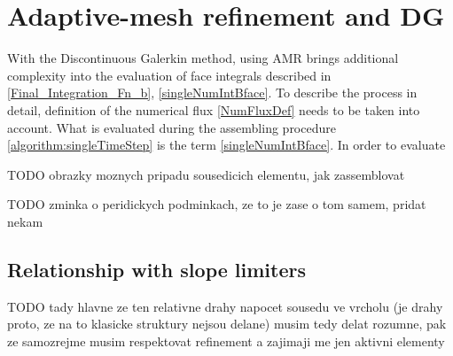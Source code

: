 \section{Adaptive-mesh refinement and DG}
With the Discontinuous Galerkin method, using AMR brings additional complexity into the evaluation of face integrals described in \ref{Final_Integration_Fn_b}, \ref{singleNumIntBface}.
To describe the process in detail, definition of the numerical flux \ref{NumFluxDef} needs to be taken into account. What is evaluated during the assembling procedure \ref{algorithm:singleTimeStep} is the term \ref{singleNumIntBface}. In order to evaluate 

TODO obrazky moznych pripadu sousedicich elementu, jak zassemblovat

TODO zminka o peridickych podminkach, ze to je zase o tom samem, pridat nekam \label{amrPer}

\subsection{Relationship with slope limiters}

TODO tady hlavne ze ten relativne drahy napocet sousedu ve vrcholu (je drahy proto, ze na to klasicke struktury nejsou delane) musim tedy delat rozumne, pak ze samozrejme musim respektovat refinement a zajimaji me jen aktivni elementy